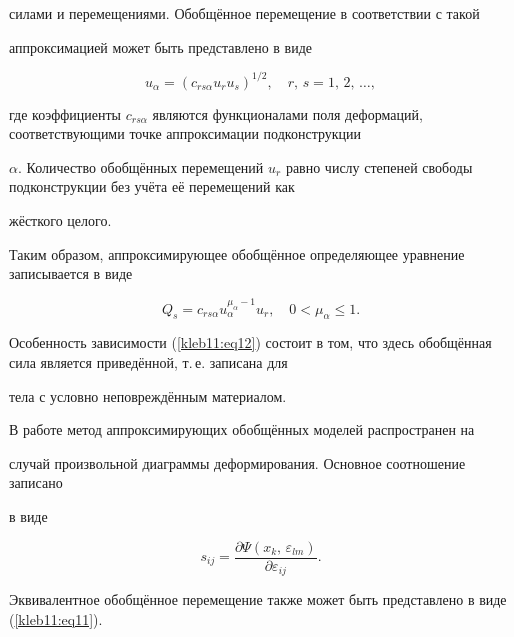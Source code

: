силами и перемещениями. Обобщённое перемещение в соответствии с такой

аппроксимацией может быть представлено в виде

\begin{equation}

\label{kleb11:eq11}

 u_\alpha =\left( c_{rs \alpha } u_r u_s  \right)^{1/2},\quad r,\,s=1,\,2,\,\ldots,

\end{equation}

где коэффициенты $c_{rs \alpha } $ являются функционалами поля деформаций, соответствующими точке аппроксимации подконструкции

$\alpha $. Количество обобщённых перемещений $u_r$ равно числу степеней свободы подконструкции без учёта её перемещений как

жёсткого целого.



Таким образом, аппроксимирующее обобщённое определяющее уравнение записывается в виде

\begin{equation}

\label{kleb11:eq12}

 Q_s =c_{rs \alpha } u_\alpha^{\mu _\alpha -1} u_r ,\quad 0<\mu_\alpha \le 1.

\end{equation}



Особенность зависимости (\ref{kleb11:eq12}) состоит в том, что здесь обобщённая сила является приведённой, т.\,е. записана для

тела с условно неповреждённым материалом.



В работе \cite{kleb11:bib15} метод аппроксимирующих обобщённых моделей распространен на

случай произвольной диаграммы деформирования. Основное соотношение записано

в виде

\[

s_{ij} =\frac{\partial \Psi ( x_k ,\,\varepsilon_{lm} )}{\partial \varepsilon_{ij}}.

\]



Эквивалентное обобщённое перемещение также может быть представлено в виде (\ref{kleb11:eq11}).





